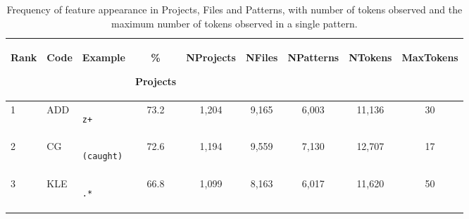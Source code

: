\begin{table*}
\begin{center}
\begin{footnotesize}
\caption{Frequency of feature appearance in Projects, Files and Patterns, with number of tokens observed and the maximum number of tokens observed in a single pattern.}
\label{table:featureStatsOnly}
\begin{tabular}
{lllcccc  cc}
\begin{scriptsize}\textbf{Rank}\end{scriptsize} & \begin{scriptsize}\textbf{Code}\end{scriptsize} & \begin{scriptsize}\textbf{Example}\end{scriptsize} & \% \begin{scriptsize}\textbf{Projects}\end{scriptsize} & \begin{scriptsize}\textbf{NProjects}\end{scriptsize} & \begin{scriptsize}\textbf{NFiles}\end{scriptsize} & \begin{scriptsize}\textbf{NPatterns}\end{scriptsize} & \begin{scriptsize}\textbf{NTokens}\end{scriptsize} & \begin{scriptsize}\textbf{MaxTokens}\end{scriptsize} \\
\toprule[0.12em]
1 & ADD & \begin{minipage}{0.5in}\begin{verbatim}z+\end{verbatim}\end{minipage} & 73.2 & 1,204 & 9,165 & 6,003 & 11,136 & 30 \\
\midrule
2 & CG & \begin{minipage}{0.5in}\begin{verbatim}(caught)\end{verbatim}\end{minipage} & 72.6 & 1,194 & 9,559 & 7,130 & 12,707 & 17 \\
\midrule
3 & KLE & \begin{minipage}{0.5in}\begin{verbatim}.*\end{verbatim}\end{minipage} & 66.8 & 1,099 & 8,163 & 6,017 & 11,620 & 50 \\

\end{tabular}
\end{footnotesize}
\end{center}
\end{table*}
